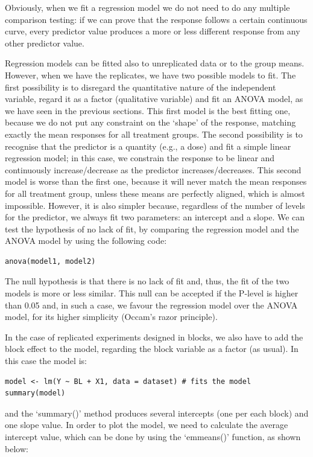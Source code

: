 \documentclass[a4paper,12pt,oneside]{book}
\begin{document}
Obviously, when we fit a regression model we do not need to do any multiple comparison testing: if we can prove that the response follows a certain continuous curve, every predictor value produces a more or less different response from any other predictor value.

Regression models can be fitted also to unreplicated data or to the group means. However, when we have the replicates, we have two possible models to fit. The first possibility is to disregard the quantitative nature of the independent variable, regard it as a factor (qualitative variable) and fit an ANOVA model, as we have seen in the previous sections. This first model is the best fitting one, because we do not put any constraint on the `shape' of the response, matching exactly the mean responses for all treatment groups. The second possibility is to recognise that the predictor is a quantity (e.g., a dose) and fit a simple linear regression model; in this case, we constrain the response to be linear and continuously increase/decrease as the predictor increases/decreases. This second model is worse than the first one, because it will never match the mean responses for all treatment group, unless these means are perfectly aligned, which is almost impossible. However, it is also simpler because, regardless of the number of levels for the predictor, we always fit two parameters: an intercept and a slope. We can test the hypothesis of no lack of fit, by comparing the regression model and the ANOVA model by using the following code:

\begin{verbatim}
anova(model1, model2)
\end{verbatim}

The null hypothesis is that there is no lack of fit and, thus, the fit of the two models is more or less similar. This null can be accepted if the P-level is higher than 0.05 and, in such a case, we favour the regression model over the ANOVA model, for its higher simplicity (Occam's razor principle).

In the case of replicated experiments designed in blocks, we also have to add the block effect to the model, regarding the block variable as a factor (as usual). In this case the model is:

\begin{verbatim}
model <- lm(Y ~ BL + X1, data = dataset) # fits the model
summary(model)
\end{verbatim}

and the `summary()' method produces several intercepts (one per each block) and one slope value. In order to plot the model, we need to calculate the average intercept value, which can be done by using the `emmeans()' function, as shown below:
\end{document}
